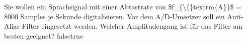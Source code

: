     {Sie wollen ein Sprachsignal mit einer Abtastrate von \$f\_\{\textbackslash\{\}textrm\{A\}\}\$ = 8000 Samples je Sekunde digitalisieren. Vor dem A/D-Umsetzer soll ein Anti-Alias-Filter eingesetzt werden. Welcher Amplitudengang ist für das Filter am besten geeignet?}
    {}
    {}
    {}
    {}
    {false}{true}